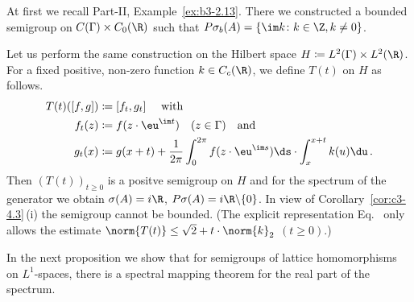 \begin{example}\label{ex:c3-4.4}
	At first we recall Part-II, Example~\ref{ex:b3-2.13}. 
	There we constructed a bounded semigroup on $C(\Gamma)\times C_{0}(\R )$ such that $P\sigma_{b}(A) = \{\im k \colon k \in \Z, k \neq 0\}$.

    Let us perform the same construction on the Hilbert space
    $H \coloneqq L^2(\Gamma)\times L^2(\R )$.
    For a fixed positive, non-zero function $k \in C_c(\R )$,
    we define $T(t)$ on $H$ as follows.
\begin{equation}\label{eq:c3-4.6}
	\begin{split} 
		T(t)([f,g]) &\coloneqq [f_t,g_t] \quad \ \text{with}\\
		f_t(z) &\coloneqq f(z \cdot \eu^{\im t}) \quad (z \in \Gamma) \quad \text{and}\\
		g_t(x) &\coloneqq g(x+t) + \frac{1}{2\pi}\int_{0}^{2\pi} f(z \cdot \eu^{\im s}) \ds  \cdot \int_{x}^{x+t} k(u) \du \,.
	\end{split}
\end{equation}
Then $(T(t))_{t \geq 0}$ is a positve semigroup on $H$ and for the spectrum of
the generator we obtain $\sigma(A) = i\R $, $P\sigma(A) = i\R \backslash\{0\}$.
In view of Corollary~\ref{cor:c3-4.3}\,(i) the semigroup cannot be bounded.
(The explicit representation Eq.~ only allows the estimate $\norm{T(t)} \leq \sqrt{2} + t \cdot \norm{k}_2$ $(t\geq 0)$.)
\end{example}

In the next proposition we show that for semigroups of lattice homomorphisms on $L^1$-spaces, there is a spectral mapping theorem for the real part of the spectrum.

